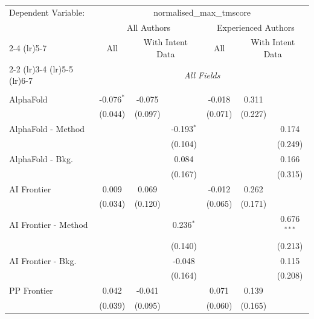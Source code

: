 \begingroup
\centering
\begin{tabular}{lcccccc}
   \tabularnewline \midrule \midrule
   Dependent Variable: & \multicolumn{6}{c}{normalised\_max\_tmscore}\\
 & \multicolumn{3}{c}{All Authors} & \multicolumn{3}{c}{Experienced Authors} \\
\cmidrule(lr){2-4} \cmidrule(lr){5-7}
 & \multicolumn{1}{c}{All} & \multicolumn{2}{c}{With Intent Data} & \multicolumn{1}{c}{All} & \multicolumn{2}{c}{With Intent Data} \\
\cmidrule(lr){2-2} \cmidrule(lr){3-4} \cmidrule(lr){5-5} \cmidrule(lr){6-7}
 & \multicolumn{6}{c}{\textit{All Fields}} \\ \\
   AlphaFold            & -0.076$^{*}$ & -0.075  &              & -0.018  & 0.311   &   \\   
                        & (0.044)      & (0.097) &              & (0.071) & (0.227) &   \\   
   AlphaFold - Method   &              &         & -0.193$^{*}$ &         &         & 0.174\\   
                        &              &         & (0.104)      &         &         & (0.249)\\   
   AlphaFold - Bkg.     &              &         & 0.084        &         &         & 0.166\\   
                        &              &         & (0.167)      &         &         & (0.315)\\   
   AI Frontier          & 0.009        & 0.069   &              & -0.012  & 0.262   &   \\   
                        & (0.034)      & (0.120) &              & (0.065) & (0.171) &   \\   
   AI Frontier - Method &              &         & 0.236$^{*}$  &         &         & 0.676$^{***}$\\   
                        &              &         & (0.140)      &         &         & (0.213)\\   
   AI Frontier - Bkg.   &              &         & -0.048       &         &         & 0.115\\   
                        &              &         & (0.164)      &         &         & (0.208)\\   
   PP Frontier          & 0.042        & -0.041  &              & 0.071   & 0.139   &   \\   
                        & (0.039)      & (0.095) &              & (0.060) & (0.165) &   \\   

\end{tabular}
